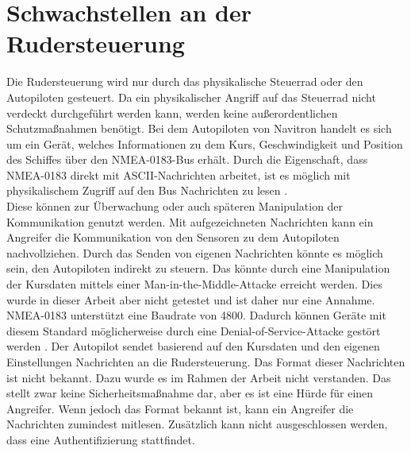 \section{Schwachstellen an der Rudersteuerung}
Die Rudersteuerung wird nur durch das physikalische Steuerrad oder den Autopiloten gesteuert. Da ein physikalischer
Angriff auf das Steuerrad nicht verdeckt durchgeführt werden kann, werden keine außerordentlichen Schutzmaßnahmen benötigt.
Bei dem Autopiloten von Navitron handelt es sich um ein Gerät, welches Informationen zu dem Kurs, Geschwindigkeit und
Position des Schiffes über den NMEA-0183-Bus erhält. Durch die Eigenschaft, dass NMEA-0183 direkt mit ASCII-Nachrichten
arbeitet, ist es möglich mit physikalischem Zugriff auf den Bus Nachrichten zu lesen \cite{nmea0183}. \\
Diese können zur Überwachung oder auch späteren Manipulation der Kommunikation genutzt werden. Mit aufgezeichneten Nachrichten
kann ein Angreifer die Kommunikation von den Sensoren zu dem Autopiloten nachvollziehen. Durch das Senden von eigenen Nachrichten
könnte es möglich sein, den Autopiloten indirekt zu steuern. Das könnte durch eine Manipulation der Kursdaten mittels einer Man-in-the-Middle-Attacke
erreicht werden. Dies wurde in dieser Arbeit aber nicht getestet und ist daher nur eine Annahme. 
NMEA-0183 unterstützt eine Baudrate von 4800. Dadurch können Geräte mit diesem Standard möglicherweise durch eine 
Denial-of-Service-Attacke gestört werden \cite{Tran2021}.
Der Autopilot sendet basierend auf den Kursdaten und den eigenen Einstellungen Nachrichten an die Rudersteuerung. 
Das Format dieser Nachrichten ist nicht bekannt. Dazu wurde es im Rahmen der Arbeit nicht verstanden.
Das stellt zwar keine Sicherheitsmaßnahme dar, aber es ist eine Hürde für einen Angreifer. Wenn jedoch 
das Format bekannt ist, kann ein Angreifer die Nachrichten zumindest mitlesen. Zusätzlich kann
nicht ausgeschlossen werden, dass eine Authentifizierung stattfindet.\\

